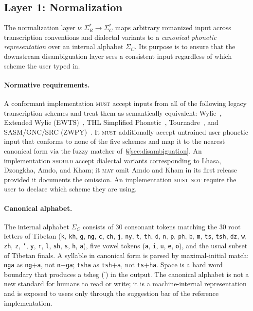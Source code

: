 \documentclass[11pt]{article}
\newcommand{\tib}[1]{{\fontspec{Jomolhari}#1}}
\begin{document}
\subsection{Layer 1: Normalization}
\label{sec:layer-normalization}

The normalization layer $\nu: \Sigma_R^* \to \Sigma_C^*$ maps arbitrary romanized input across transcription conventions and dialectal variants to a \emph{canonical phonetic representation} over an internal alphabet $\Sigma_C$. Its purpose is to ensure that the downstream disambiguation layer sees a consistent input regardless of which scheme the user typed in.

\paragraph{Normative requirements.} A conformant implementation \textsc{must} accept inputs from all of the following legacy transcription schemes and treat them as semantically equivalent: Wylie~\cite{wylie1959}, Extended Wylie (EWTS)~\cite{ewts}, THL Simplified Phonetic~\cite{thl}, Tournadre~\cite{tournadre2003}, and SASM/GNC/SRC (ZWPY)~\cite{sasm1982}. It \textsc{must} additionally accept untrained user phonetic input that conforms to none of the five schemes and map it to the nearest canonical form via the fuzzy matcher of~\S\ref{sec:disambiguation}. An implementation \textsc{should} accept dialectal variants corresponding to Lhasa, Dzongkha, Amdo, and Kham; it \textsc{may} omit Amdo and Kham in its first release provided it documents the omission. An implementation \textsc{must not} require the user to declare which scheme they are using.

\paragraph{Canonical alphabet.} The internal alphabet $\Sigma_C$ consists of 30 consonant tokens matching the 30 root letters of Tibetan (\texttt{k}, \texttt{kh}, \texttt{g}, \texttt{ng}, \texttt{c}, \texttt{ch}, \texttt{j}, \texttt{ny}, \texttt{t}, \texttt{th}, \texttt{d}, \texttt{n}, \texttt{p}, \texttt{ph}, \texttt{b}, \texttt{m}, \texttt{ts}, \texttt{tsh}, \texttt{dz}, \texttt{w}, \texttt{zh}, \texttt{z}, \texttt{'}, \texttt{y}, \texttt{r}, \texttt{l}, \texttt{sh}, \texttt{s}, \texttt{h}, \texttt{a}), five vowel tokens (\texttt{a}, \texttt{i}, \texttt{u}, \texttt{e}, \texttt{o}), and the usual subset of Tibetan finals. A syllable in canonical form is parsed by maximal-initial match: \texttt{nga} as \texttt{ng}+\texttt{a}, not \texttt{n}+\texttt{ga}; \texttt{tsha} as \texttt{tsh}+\texttt{a}, not \texttt{ts}+\texttt{ha}. Space is a hard word boundary that produces a tsheg (\tib{་}) in the output. The canonical alphabet is not a new standard for humans to read or write; it is a machine-internal representation and is exposed to users only through the suggestion bar of the reference implementation.
\end{document}
